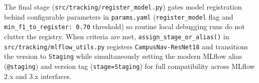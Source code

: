 \documentclass[10pt,a4paper]{article}
\begin{document}
The final stage (\texttt{src/tracking/register\_model.py}) gates model registration behind configurable parameters in \texttt{params.yaml} (\texttt{register\_model} flag and \texttt{min\_f1\_to\_register: 0.70} threshold) so routine local debugging runs do not clutter the registry. When criteria are met, \texttt{assign\_stage\_or\_alias()} in \texttt{src/tracking/mlflow\_utils.py} registers \texttt{CampusNav-ResNet18} and transitions the version to \texttt{Staging} while simultaneously setting the modern MLflow alias (\texttt{@staging}) and version tag (\texttt{stage=Staging}) for full compatibility across MLflow 2.x and 3.x interfaces.
\end{document}
